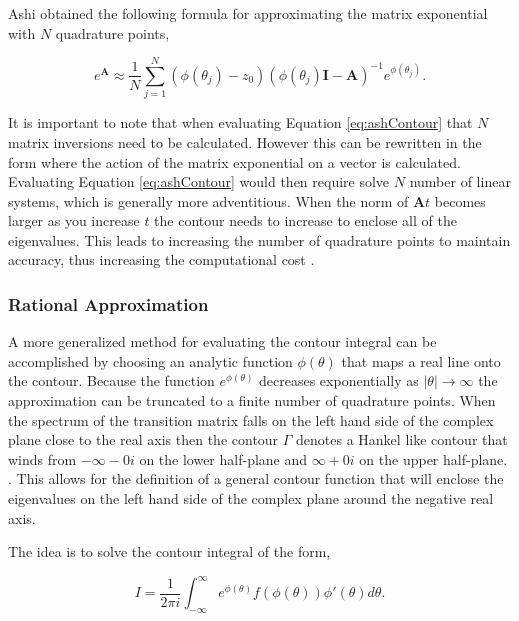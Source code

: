 \noindent Ashi obtained the following formula for approximating the matrix exponential with $N$ quadrature points, 

\begin{equation}
    e^{\boldsymbol{A}} \approx \frac{1}{N}\sum_{j=1}^{N}(\phi(\theta_{j}) - z_{0})(\phi(\theta_{j})\boldsymbol{I} - \boldsymbol{A})^{-1}e^{\phi(\theta_{j})}.
    \label{eq:ashContour}
\end{equation}


It is important to note that when evaluating Equation \ref{eq:ashContour} that $N$ matrix inversions need to be calculated. However this can be rewritten in the form where the action of the matrix exponential on a vector is calculated. Evaluating Equation \ref{eq:ashContour} would then require solve $N$ number of linear systems, which is generally more adventitious. When the norm of $\boldsymbol{A}t$ becomes larger as you increase $t$ the contour needs to increase to enclose all of the eigenvalues. This leads to increasing the number of quadrature points to maintain accuracy, thus increasing the computational cost \cite{ash2009}. 

\subsubsection{Rational Approximation}
A more generalized method for evaluating the contour integral can be accomplished by choosing an analytic function $\phi(\theta)$ that maps a real line onto the contour. Because the function $e^{\phi(\theta)}$ decreases exponentially as $|\theta| \rightarrow \infty$ the approximation can be truncated to a finite number of quadrature points. When the spectrum of the transition matrix falls on the left hand side of the complex plane close to the real axis then the contour $\Gamma$ denotes a Hankel like contour that winds from $-\infty-0i$ on the lower half-plane and $\infty+0i$ on the upper half-plane. \cite{Trefethen2006}. This allows for the definition of a general contour function that will enclose the eigenvalues on the left hand side of the complex plane around the negative real axis. 

The idea is to solve the contour integral of the form,

\begin{equation}
    I = \frac{1}{2\pi i}\int_{-\infty}^{\infty}e^{\phi(\theta)}f(\phi(\theta))\phi'(\theta)d\theta.
    \label{eq:generalContourIntegral}
\end{equation}

